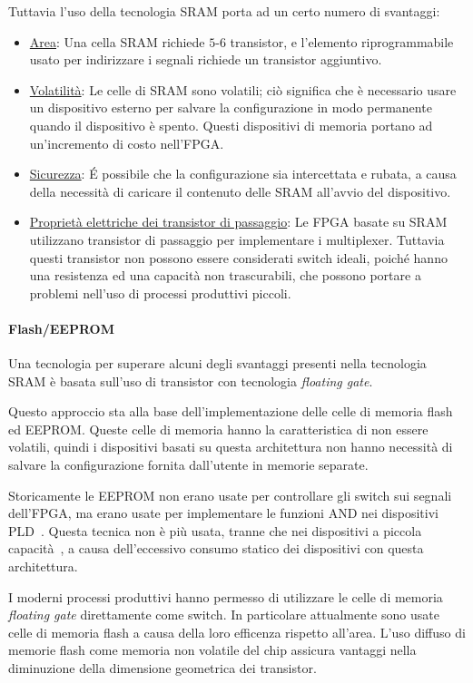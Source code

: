 Tuttavia l'uso della tecnologia SRAM porta ad un certo numero di svantaggi:
\begin{itemize}
	\item \underline{Area}: Una cella SRAM richiede $5$-$6$ transistor, e l'elemento riprogrammabile usato per indirizzare i segnali richiede un transistor aggiuntivo.
	\item \underline{Volatilità}: Le celle di SRAM sono volatili; ciò significa che è necessario usare un dispositivo esterno per salvare la configurazione in modo permanente quando il dispositivo è spento. Questi dispositivi di memoria portano ad un'incremento di costo nell'FPGA.
	\item \underline{Sicurezza}: \'E possibile che la configurazione sia intercettata e rubata, a causa della necessità di caricare il contenuto delle SRAM all'avvio del dispositivo.
	\item \underline{Proprietà elettriche dei transistor di passaggio}: Le FPGA basate su SRAM utilizzano transistor di passaggio per implementare i multiplexer. Tuttavia questi transistor non possono essere considerati switch ideali, poiché hanno una resistenza ed una capacità non trascurabili, che possono portare a problemi nell'uso di processi produttivi piccoli.
\end{itemize}

\paragraph{Flash/EEPROM}
Una tecnologia per superare alcuni degli svantaggi presenti nella tecnologia SRAM è basata sull'uso di transistor con tecnologia \textit{floating gate}. 

Questo approccio sta alla base dell'implementazione delle celle di memoria flash ed EEPROM. Queste celle di memoria hanno la caratteristica di non essere volatili, quindi i dispositivi basati su questa architettura non hanno necessità di salvare la configurazione fornita dall'utente in memorie separate.

Storicamente le EEPROM non erano usate per controllare gli switch sui segnali dell'FPGA, ma erano usate per implementare le funzioni AND nei dispositivi PLD~\cite{fpgabook}. Questa tecnica non è più usata, tranne che nei dispositivi a piccola capacità~\cite{cpldxilinx}, a causa dell'eccessivo consumo statico dei dispositivi con questa architettura.

I moderni processi produttivi hanno permesso di utilizzare le celle di memoria \textit{floating gate} direttamente come switch. In particolare attualmente sono usate celle di memoria flash a causa della loro efficenza rispetto all'area. L'uso diffuso di memorie flash come memoria non volatile del chip assicura vantaggi nella diminuzione della dimensione geometrica dei transistor.

